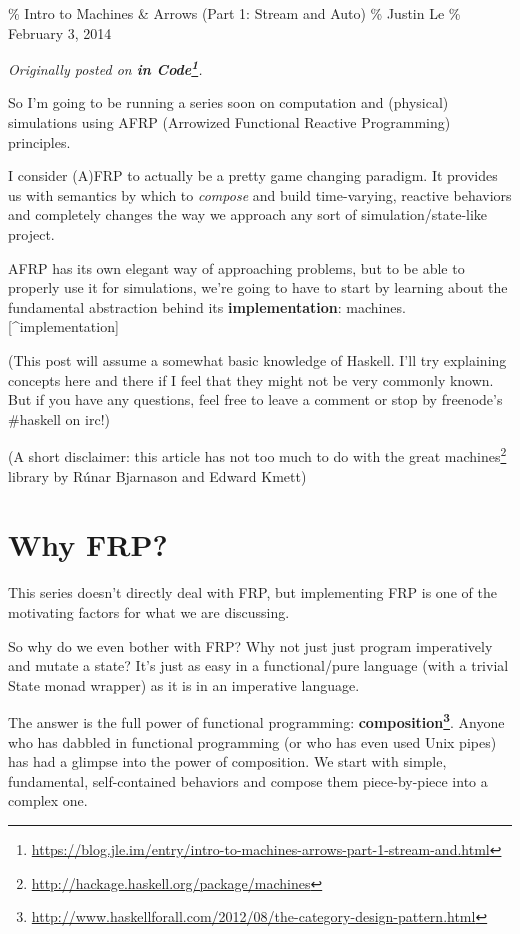 \documentclass[]{article}
\renewcommand{\href}[2]{#2\footnote{\url{#1}}}
\begin{document}
\% Intro to Machines \& Arrows (Part 1: Stream and Auto) \% Justin Le \%
February 3, 2014

\emph{Originally posted on
\textbf{\href{https://blog.jle.im/entry/intro-to-machines-arrows-part-1-stream-and.html}{in
Code}}.}

So I'm going to be running a series soon on computation and (physical)
simulations using AFRP (Arrowized Functional Reactive Programming) principles.

I consider (A)FRP to actually be a pretty game changing paradigm. It provides us
with semantics by which to \emph{compose} and build time-varying, reactive
behaviors and completely changes the way we approach any sort of
simulation/state-like project.

AFRP has its own elegant way of approaching problems, but to be able to properly
use it for simulations, we're going to have to start by learning about the
fundamental abstraction behind its \textbf{implementation}:
machines.{[}\^{}implementation{]}

(This post will assume a somewhat basic knowledge of Haskell. I'll try
explaining concepts here and there if I feel that they might not be very
commonly known. But if you have any questions, feel free to leave a comment or
stop by freenode's \#haskell on irc!)

(A short disclaimer: this article has not too much to do with the great
\href{http://hackage.haskell.org/package/machines}{machines} library by Rúnar
Bjarnason and Edward Kmett)

\section{Why FRP?}

This series doesn't directly deal with FRP, but implementing FRP is one of the
motivating factors for what we are discussing.

So why do we even bother with FRP? Why not just just program imperatively and
mutate a state? It's just as easy in a functional/pure language (with a trivial
State monad wrapper) as it is in an imperative language.

The answer is the full power of functional programming:
\textbf{\href{http://www.haskellforall.com/2012/08/the-category-design-pattern.html}{composition}}.
Anyone who has dabbled in functional programming (or who has even used Unix
pipes) has had a glimpse into the power of composition. We start with simple,
fundamental, self-contained behaviors and compose them piece-by-piece into a
complex one.
\end{document}
